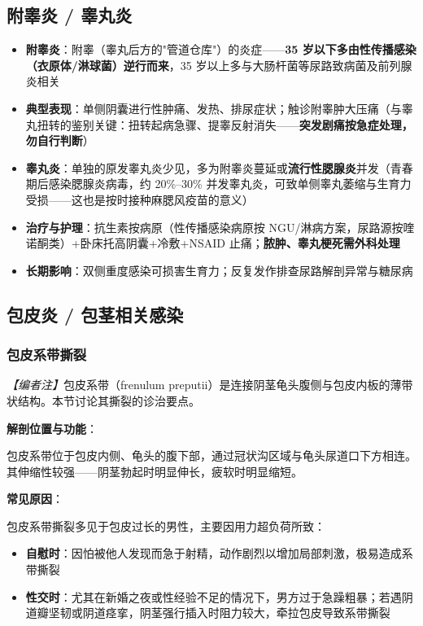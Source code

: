 \documentclass[12pt,a4paper,twoside]{ctexbook}
\begin{document}
\subsection{附睾炎 / 睾丸炎}


\begin{itemize}
	\item \textbf{附睾炎}：附睾（睾丸后方的"管道仓库"）的炎症——\textbf{35 岁以下多由性传播感染（衣原体/淋球菌）逆行而来}，35 岁以上多与大肠杆菌等尿路致病菌及前列腺炎相关
	\item \textbf{典型表现}：单侧阴囊进行性肿痛、发热、排尿症状；触诊附睾肿大压痛（与睾丸扭转的鉴别关键：扭转起病急骤、提睾反射消失——\textbf{突发剧痛按急症处理，勿自行判断}）
	\item \textbf{睾丸炎}：单独的原发睾丸炎少见，多为附睾炎蔓延或\textbf{流行性腮腺炎}并发（青春期后感染腮腺炎病毒，约 20\%--30\% 并发睾丸炎，可致单侧睾丸萎缩与生育力受损——这也是按时接种麻腮风疫苗的意义）
	\item \textbf{治疗与护理}：抗生素按病原（性传播感染病原按 NGU/淋病方案，尿路源按喹诺酮类）+卧床托高阴囊+冷敷+NSAID 止痛；\textbf{脓肿、睾丸梗死需外科处理}
	\item \textbf{长期影响}：双侧重度感染可损害生育力；反复发作排查尿路解剖异常与糖尿病
\end{itemize}

\subsection{包皮炎 / 包茎相关感染}

\subsubsection{包皮系带撕裂}

\noindent\textit{【编者注】}包皮系带（frenulum preputii）是连接阴茎龟头腹侧与包皮内板的薄带状结构。本节讨论其撕裂的诊治要点。

\vspace{0.5em}
\noindent\textbf{解剖位置与功能}：

包皮系带位于包皮内侧、龟头的腹下部，通过冠状沟区域与龟头尿道口下方相连。其伸缩性较强——阴茎勃起时明显伸长，疲软时明显缩短。

\vspace{0.5em}
\noindent\textbf{常见原因}：

包皮系带撕裂多见于包皮过长的男性，主要因用力超负荷所致：
\begin{itemize}
	\item \textbf{自慰时}：因怕被他人发现而急于射精，动作剧烈以增加局部刺激，极易造成系带撕裂
	\item \textbf{性交时}：尤其在新婚之夜或性经验不足的情况下，男方过于急躁粗暴；若遇阴道瓣坚韧或阴道痉挛，阴茎强行插入时阻力较大，牵拉包皮导致系带撕裂
\end{itemize}
\end{document}

